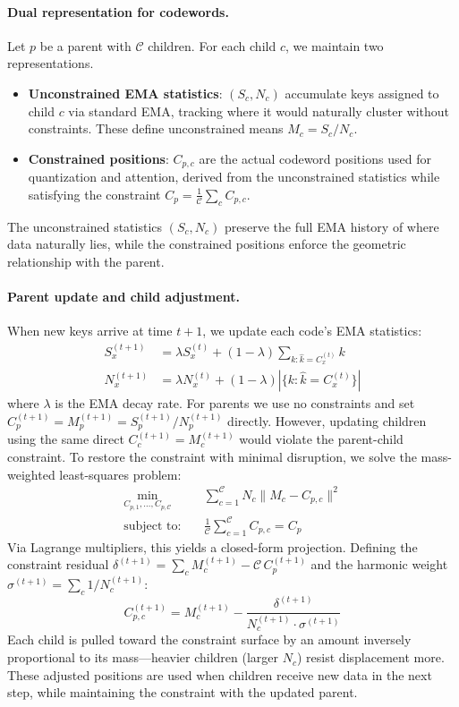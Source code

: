 \paragraph{Dual representation for codewords.} Let $p$ be a parent with $\mathcal{C}$ children. For each child $c$, we maintain two representations.
\begin{itemize}
    \item \textbf{Unconstrained EMA statistics}: $(S_c, N_c)$ accumulate keys assigned to child $c$ via standard EMA, tracking where it would naturally cluster without constraints. These define unconstrained means $M_c = S_c / N_c$.
    \item \textbf{Constrained positions}: $C_{p,c}$ are the actual codeword positions used for quantization and attention, derived from the unconstrained statistics while satisfying the constraint $C_p = \frac{1}{\mathcal{C}}\sum_c C_{p,c}$.
\end{itemize}
The unconstrained statistics $(S_c, N_c)$ preserve the full EMA history of where data naturally lies, while the constrained positions enforce the geometric relationship with the parent.

\paragraph{Parent update and child adjustment.} When new keys arrive at time $t+1$, we update each code's EMA statistics:
\begin{align}
S_x^{(t+1)} &= \lambda S_x^{(t)} + (1-\lambda) \sum_{k: \hat{k}=C^{(t)}_x} k \\
N_x^{(t+1)} &= \lambda N_x^{(t)} + (1-\lambda) |\{k :\hat{k}=C^{(t)}_x\}|
\end{align}
where $\lambda$ is the EMA decay rate. For parents we use no constraints and set $C_p^{(t+1)} = M_p^{(t+1)}= S_p^{(t+1)}/N_p^{(t+1)}$ directly. However, updating children using the same direct $C_c^{(t+1)}=M_c^{(t+1)}$ would violate the parent-child constraint.
To restore the constraint with minimal disruption, we solve the mass-weighted least-squares problem:
\begin{align*}
\min_{C_{p,1}, \ldots, C_{p,\mathcal{C}}} &\sum_{c=1}^{\mathcal{C}} N_c \|M_c - C_{p,c}\|^2 \\
\text{subject to:} \quad & \frac{1}{\mathcal{C}}\sum_{c=1}^{\mathcal{C}} C_{p,c} = C_p
\end{align*}
Via Lagrange multipliers, this yields a closed-form projection. Defining the constraint residual $\delta^{(t+1)} = \sum_c M_c^{(t+1)} - \mathcal{C}\, C_p^{(t+1)}$ and the harmonic weight $\sigma^{(t+1)} = \sum_c 1/N_c^{(t+1)}$:
\begin{equation}
\label{eq:child_constraint_solve}
C_{p,c}^{(t+1)} = M_c^{(t+1)} - \frac{\delta^{(t+1)}}{N_c^{(t+1)} \cdot \sigma^{(t+1)}}
\end{equation}
Each child is pulled toward the constraint surface by an amount inversely proportional to its mass---heavier children (larger $N_c$) resist displacement more.
These adjusted positions are used when children receive new data in the next step, while maintaining the constraint with the updated parent.

